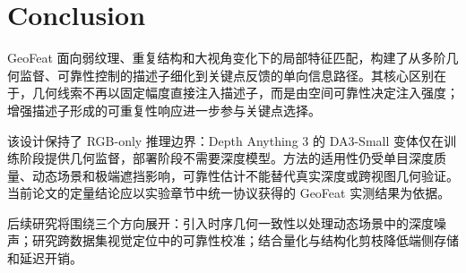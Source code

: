 \documentclass{article}
\begin{document}
\begin{table}[!t]
\centering
\caption{资源与运行时间比较。SuperPoint、XFeat 和 LiftFeat 数值按照 LiftFeat~\cite{LiftFeat} 原文填写；GeoFeat 的 NVIDIA Jetson TX2 结果待实测。原文 GPU 延迟来自 NVIDIA Jetson Xavier NX，仅作为参考。}
\label{tab:runtime}
\small
{}
\end{table}

\section{Conclusion}
GeoFeat 面向弱纹理、重复结构和大视角变化下的局部特征匹配，构建了从多阶几何监督、可靠性控制的描述子细化到关键点反馈的单向信息路径。其核心区别在于，几何线索不再以固定幅度直接注入描述子，而是由空间可靠性决定注入强度；增强描述子形成的可重复性响应进一步参与关键点选择。

该设计保持了 RGB-only 推理边界：Depth Anything 3 的 DA3-Small 变体仅在训练阶段提供几何监督，部署阶段不需要深度模型。方法的适用性仍受单目深度质量、动态场景和极端遮挡影响，可靠性估计不能替代真实深度或跨视图几何验证。当前论文的定量结论应以实验章节中统一协议获得的 GeoFeat 实测结果为依据。

后续研究将围绕三个方向展开：引入时序几何一致性以处理动态场景中的深度噪声；研究跨数据集视觉定位中的可靠性校准；结合量化与结构化剪枝降低端侧存储和延迟开销。


\end{document}
